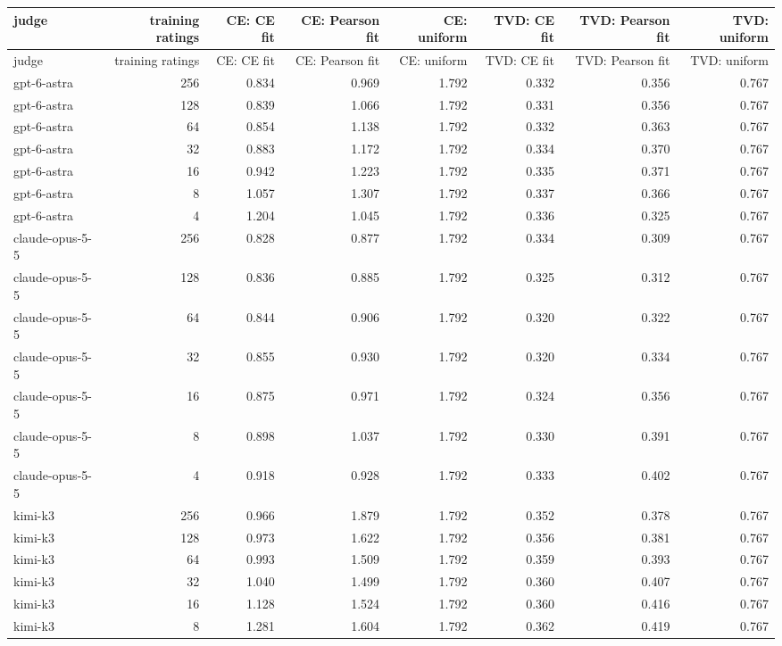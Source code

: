 \begin{longtable}{lrrrrrrr}
\toprule
judge & training ratings & CE: CE fit & CE: Pearson fit & CE: uniform & TVD: CE fit & TVD: Pearson fit & TVD: uniform \\
\midrule
\endfirsthead
\toprule
judge & training ratings & CE: CE fit & CE: Pearson fit & CE: uniform & TVD: CE fit & TVD: Pearson fit & TVD: uniform \\
\midrule
\endhead
gpt-6-astra & 256 & 0.834 & 0.969 & 1.792 & 0.332 & 0.356 & 0.767 \\
gpt-6-astra & 128 & 0.839 & 1.066 & 1.792 & 0.331 & 0.356 & 0.767 \\
gpt-6-astra & 64 & 0.854 & 1.138 & 1.792 & 0.332 & 0.363 & 0.767 \\
gpt-6-astra & 32 & 0.883 & 1.172 & 1.792 & 0.334 & 0.370 & 0.767 \\
gpt-6-astra & 16 & 0.942 & 1.223 & 1.792 & 0.335 & 0.371 & 0.767 \\
gpt-6-astra & 8 & 1.057 & 1.307 & 1.792 & 0.337 & 0.366 & 0.767 \\
gpt-6-astra & 4 & 1.204 & 1.045 & 1.792 & 0.336 & 0.325 & 0.767 \\
claude-opus-5-5 & 256 & 0.828 & 0.877 & 1.792 & 0.334 & 0.309 & 0.767 \\
claude-opus-5-5 & 128 & 0.836 & 0.885 & 1.792 & 0.325 & 0.312 & 0.767 \\
claude-opus-5-5 & 64 & 0.844 & 0.906 & 1.792 & 0.320 & 0.322 & 0.767 \\
claude-opus-5-5 & 32 & 0.855 & 0.930 & 1.792 & 0.320 & 0.334 & 0.767 \\
claude-opus-5-5 & 16 & 0.875 & 0.971 & 1.792 & 0.324 & 0.356 & 0.767 \\
claude-opus-5-5 & 8 & 0.898 & 1.037 & 1.792 & 0.330 & 0.391 & 0.767 \\
claude-opus-5-5 & 4 & 0.918 & 0.928 & 1.792 & 0.333 & 0.402 & 0.767 \\
kimi-k3 & 256 & 0.966 & 1.879 & 1.792 & 0.352 & 0.378 & 0.767 \\
kimi-k3 & 128 & 0.973 & 1.622 & 1.792 & 0.356 & 0.381 & 0.767 \\
kimi-k3 & 64 & 0.993 & 1.509 & 1.792 & 0.359 & 0.393 & 0.767 \\
kimi-k3 & 32 & 1.040 & 1.499 & 1.792 & 0.360 & 0.407 & 0.767 \\
kimi-k3 & 16 & 1.128 & 1.524 & 1.792 & 0.360 & 0.416 & 0.767 \\
kimi-k3 & 8 & 1.281 & 1.604 & 1.792 & 0.362 & 0.419 & 0.767 \\

\end{longtable}
